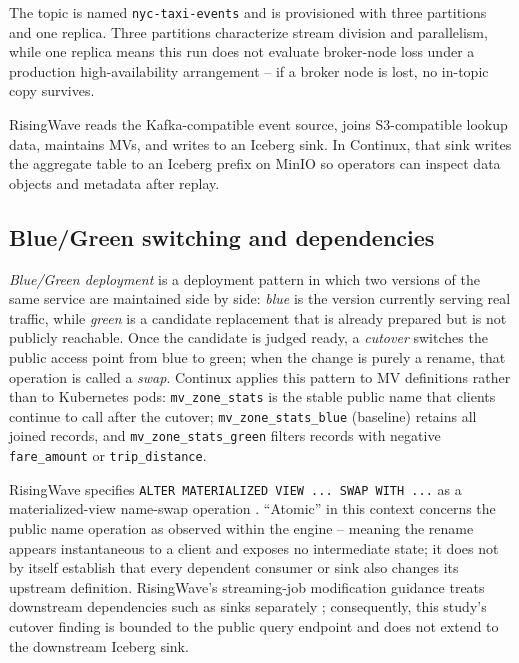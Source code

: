 The topic is named \texttt{nyc-taxi-events} and is provisioned with three partitions and one replica. Three partitions characterize stream division and parallelism, while one replica means this run does not evaluate broker-node loss under a production high-availability arrangement -- if a broker node is lost, no in-topic copy survives.

RisingWave reads the Kafka-compatible event source, joins S3-compatible lookup data, maintains MVs, and writes to an Iceberg sink. In Continux, that sink writes the aggregate table to an Iceberg prefix on MinIO so operators can inspect data objects and metadata after replay.

\subsection{Blue/Green switching and dependencies}
\emph{Blue/Green deployment} is a deployment pattern in which two versions of the same service are maintained side by side: \emph{blue} is the version currently serving real traffic, while \emph{green} is a candidate replacement that is already prepared but is not publicly reachable. Once the candidate is judged ready, a \emph{cutover} switches the public access point from blue to green; when the change is purely a rename, that operation is called a \emph{swap}. Continux applies this pattern to MV definitions rather than to Kubernetes pods: \texttt{mv\_zone\_stats} is the stable public name that clients continue to call after the cutover; \texttt{mv\_zone\_stats\_blue} (baseline) retains all joined records, and \texttt{mv\_zone\_stats\_green} filters records with negative \texttt{fare\_amount} or \texttt{trip\_distance}.

RisingWave specifies \texttt{ALTER MATERIALIZED VIEW ... SWAP WITH ...} as a materialized-view name-swap operation \parencite{risingwaveSwap}. ``Atomic'' in this context concerns the public name operation as observed within the engine -- meaning the rename appears instantaneous to a client and exposes no intermediate state; it does not by itself establish that every dependent consumer or sink also changes its upstream definition. RisingWave's streaming-job modification guidance treats downstream dependencies such as sinks separately \parencite{risingwaveAlterJobs}; consequently, this study's cutover finding is bounded to the public query endpoint and does not extend to the downstream Iceberg sink.

